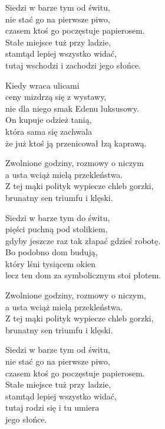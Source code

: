 \begin{text}
    Siedzi w barze tym od świtu,\\
    nie stać go na pierwsze piwo,\\
    czasem ktoś go poczęstuje papierosem.\\
    Stałe miejsce tuż przy ladzie,\\
    stamtąd lepiej wszystko widać,\\
    tutaj wschodzi i zachodzi jego słońce.

    Kiedy wraca ulicami\\
    ceny mizdrzą się z wystawy,\\
    nie dla niego smak Edenu luksusowy.\\
    On kupuje odzież tanią,\\
    która sama się zachwala\\
    że już ktoś ją przenicował łzą kaprawą.

    Zwolnione godziny, rozmowy o niczym\\
    a usta wciąż mielą przekleństwa.\\
    Z tej mąki polityk wypiecze chleb gorzki,\\
    brunatny sen triumfu i klęski.

    Siedzi w barze tym do świtu,\\
    pięści puchną pod stolikiem,\\
    gdyby jeszcze raz tak złapać gdzieś robotę.\\
    Bo podobno dom budują,\\
    który lśni tysiącem okien\\
    lecz ten dom za symbolicznym stoi płotem.

    Zwolnione godziny, rozmowy o niczym,\\
    a usta wciąż mielą przekleństwa.\\
    Z tej mąki polityk wypiecze chleb gorzki,\\
    brunatny sen triumfu i klęski.

    Siedzi w barze tym od świtu,\\
    nie stać go na pierwsze piwo,\\
    czasem ktoś go poczęstuje papierosem.\\
    Stałe miejsce tuż przy ladzie,\\
    stamtąd lepiej wszystko widać,\\
    tutaj rodzi się i tu umiera\\
    jego słońce.
\end{text}
